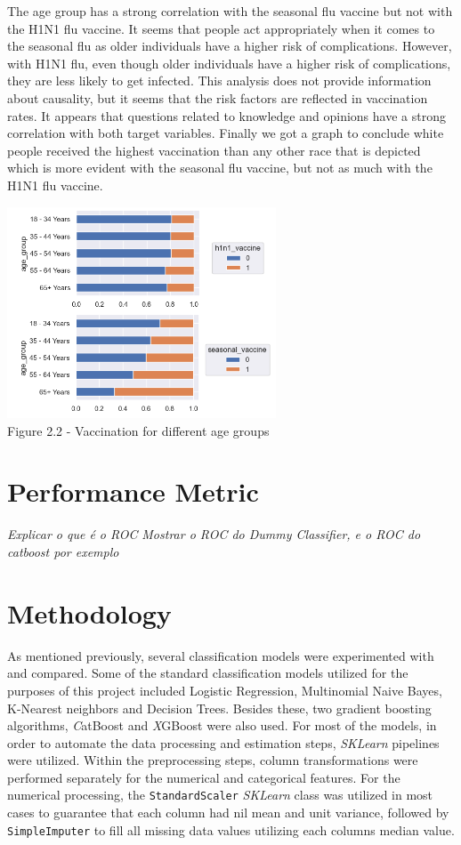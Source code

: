 \documentclass{IEEEtran}
\begin{document}
The age group has a strong correlation with the seasonal flu vaccine but not with the H1N1 flu vaccine. It seems that people act appropriately when it comes to the seasonal flu as older individuals have a higher risk of complications. However, with H1N1 flu, even though older individuals have a higher risk of complications, they are less likely to get infected. This analysis does not provide information about causality, but it seems that the risk factors are reflected in vaccination rates.
It appears that questions related to knowledge and opinions have a strong correlation with both target variables. Finally we got a  graph to conclude white people received the highest vaccination than any other race that is depicted which is more evident with the seasonal flu vaccine, but not as much with the H1N1 flu vaccine. 

\begin{center}
    \includegraphics[width = 8cm]{figures/Age.png}\\
    Figure 2.2 - Vaccination for different age groups
\end{center}



\section{Performance Metric}

\textit{Explicar o que é o ROC}
\textit{Mostrar o ROC do Dummy Classifier, e o ROC do catboost por exemplo}

\section{Methodology}
As mentioned previously, several classification models were experimented with and compared. Some of the standard classification models utilized for the purposes of this project included Logistic Regression, Multinomial Naive Bayes, K-Nearest neighbors and Decision Trees. Besides these, two gradient boosting algorithms, \textit CatBoost and \textit XGBoost were also used.
For most of the models, in order to automate the data processing and estimation steps, \textit{SKLearn} pipelines were utilized. Within the preprocessing steps, column transformations were performed separately for the numerical and categorical features. For the numerical processing, the \texttt{StandardScaler} \textit{SKLearn} class was utilized in most cases to guarantee that each column had nil mean and unit variance, followed by \texttt{SimpleImputer} to fill all missing data values utilizing each columns median value.
\end{document}
